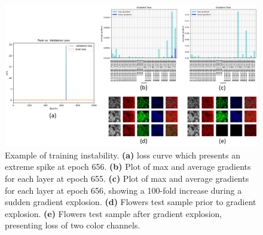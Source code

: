 \documentclass{article}
\begin{document}
\begin{figure}[!htb]
    \centering
    \includegraphics[width=\textwidth]{figs/loss_curve.png}
    \caption{Example of training instability. \textbf{(a)} loss curve which presents an extreme spike at epoch 656. \textbf{(b)} Plot of max and average gradients for each layer at epoch 655. \textbf{(c)} Plot of max and average gradients for each layer at epoch 656, showing a 100-fold increase during a sudden gradient explosion. \textbf{(d)} Flowers test sample prior to gradient explosion. \textbf{(e)} Flowers test sample after gradient explosion, presenting loss of two color channels.}
    \label{fig:loss_curve_unstable}
\end{figure}
\end{document}
